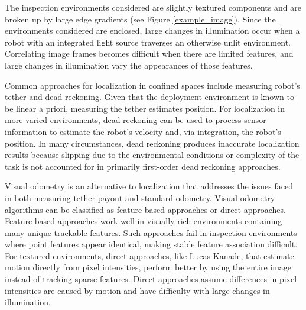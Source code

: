 \documentclass[letterpaper, 10 pt, conference]{ieeeconf}
\begin{document}
The inspection environments considered are slightly textured components and are broken up by large edge gradients (see Figure \ref{example_image}). Since the environments considered are enclosed, large changes in illumination occur when a robot with an integrated light source traverses an otherwise unlit environment. Correlating image frames becomes difficult when there are limited features, and large changes in illumination vary the appearances of those features.

Common approaches for localization in confined spaces include measuring robot's tether and dead reckoning. Given that the deployment environment is known to be linear a priori, measuring the tether estimates position. For localization in more varied environments, dead reckoning can be used to process sensor information to estimate the robot's velocity and, via integration, the robot's position. In many circumstances, dead reckoning produces inaccurate localization results because slipping due to the environmental conditions or complexity of the task is not accounted for in primarily first-order dead reckoning approaches. 



Visual odometry is an alternative to localization that addresses the issues faced in both measuring tether payout and standard odometry. Visual odometry algorithms can be classified as feature-based approaches or direct approaches. Feature-based approaches work well in visually rich environments containing many unique trackable features. Such approaches fail in inspection environments where point features appear identical, making stable feature association difficult. For textured environments, direct approaches, like Lucas Kanade, that estimate motion directly from pixel intensities, perform better by using the entire image instead of tracking sparse features. Direct approaches assume differences in pixel intensities are caused by motion and have difficulty with large changes in illumination.
\end{document}
